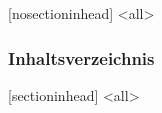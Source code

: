 
%
%
  [nosectioninhead]
\mode<all>
\begin{frame}
  \frametitle{Inhaltsverzeichnis}
  \begin{multicols*}{2}
    \vspace*{-1cm}%
    \tableofcontents[hideallsubsections]
  \end{multicols*}
\end{frame}
  [sectioninhead]
\mode<all>

%
%
